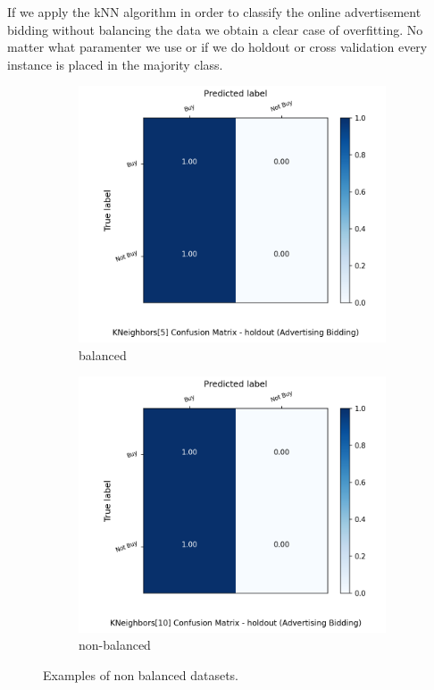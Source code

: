 \documentclass{article}
\begin{document}
If we apply the kNN algorithm in order to classify the online advertisement bidding without balancing the data we obtain a clear case of overfitting.
No matter what paramenter we use or if we do holdout or cross validation every instance is placed in the majority class.


\begin{figure}[H]
	\centering
	\begin{subfigure}{.5\textwidth}
		\centering
		\includegraphics[width=1.1\textwidth]{Plots/conv_KNeighbors_5_balance_False_holdout.png}
		\caption{balanced}
	\end{subfigure}%
	\begin{subfigure}{.5\textwidth}
		\centering
		\includegraphics[width=1.1\textwidth]{Plots/conv_KNeighbors_10_balance_False_holdout.png}
		\caption{non-balanced}
	\end{subfigure}
	\caption{{\color{red} Examples of non balanced datasets.}}
\end{figure}
\end{document}
